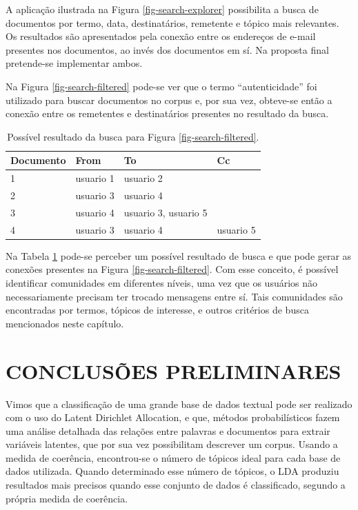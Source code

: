 \documentclass[12pt,a4paper]{article}
\begin{document}
A aplicação ilustrada na Figura \ref{fig-search-explorer} possibilita a busca de documentos por termo, data,
 destinatários, remetente e tópico mais relevantes. Os resultados são apresentados pela conexão entre os
 endereços de e-mail presentes nos documentos, ao invés dos documentos em sí. Na proposta final pretende-se implementar ambos.

Na Figura \ref{fig-search-filtered} pode-se ver que o termo ``autenticidade'' foi utilizado para buscar documentos no corpus e, por sua vez,
 obteve-se então a conexão entre os remetentes e destinatários presentes no resultado da busca.

\begin{table}[H]
  \centering
  \begin{tabular}{llll}
  Documento     & From                       & To                         & Cc         \\
  \hline
  1             & usuario 1                  & usuario 2                  &            \\
  2             & usuario 3                  & usuario 4                  &            \\
  3             & usuario 4                  & usuario 3, usuario 5       &             \\
  4             & usuario 3                  & usuario 4                  & usuario 5             \\
  \hline
  \end{tabular}
  \caption{Possível resultado da busca para Figura \ref{fig-search-filtered}.}
  \label{tab-nich-documents3}
\end{table}

Na Tabela  \ref{tab-nich-documents3} pode-se perceber um possível resultado de busca e que pode gerar as conexões presentes na Figura \ref{fig-search-filtered}.
 Com esse conceito, é possível identificar comunidades em diferentes níveis, uma vez que os usuários não necessariamente precisam ter trocado mensagens entre sí. Tais 
 comunidades são encontradas por termos, tópicos de interesse, e outros critérios de busca mencionados neste capítulo.

\section{CONCLUSÕES PRELIMINARES} \label{sec:conclusoes-preliminares}

Vimos que a classificação de uma grande base de dados textual pode ser realizado com o uso do Latent Dirichlet Allocation, e que,
 métodos probabilísticos fazem uma análise detalhada das relações entre palavras e documentos para extrair variáveis
 latentes, que por sua vez possibilitam descrever um corpus. Usando a medida de coerência, encontrou-se
 o número de tópicos ideal para cada base de dados utilizada. Quando determinado esse número de tópicos, 
 o LDA produziu resultados mais precisos quando esse conjunto de dados é classificado, segundo a própria medida de coerência.
\end{document}
